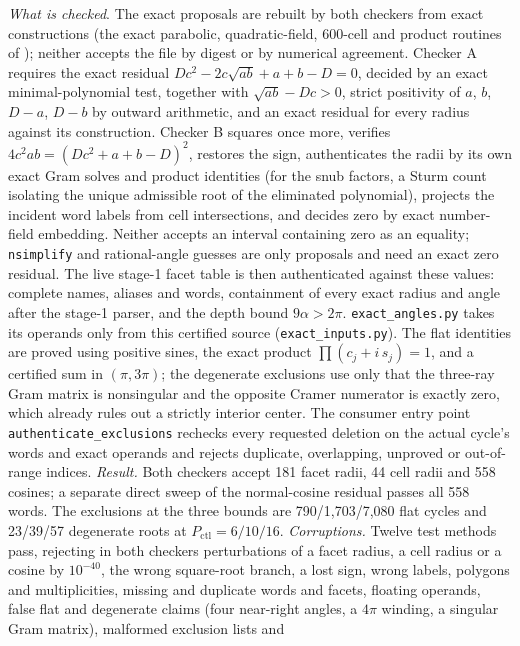 \documentclass[11pt]{article}
\theoremstyle{definition}
\theoremstyle{remark}
\newcommand{\file}[1]{\path{#1}}
\begin{document}
\noindent\emph{What is checked}. The exact proposals
 are rebuilt by both checkers from
exact constructions (the exact parabolic, quadratic-field, 600-cell and
product routines of \file{checks/independent-s1-b2/}); neither accepts the file by
digest or by numerical agreement. Checker A requires the exact residual
$Dc^2-2c\sqrt{ab}+a+b-D=0$, decided by an exact minimal-polynomial test,
together with $\sqrt{ab}-Dc>0$, strict positivity of $a$, $b$, $D-a$,
$D-b$ by outward arithmetic, and an exact residual for every radius
against its construction. Checker B squares once more, verifies
$4c^2ab=(Dc^2+a+b-D)^2$, restores the sign, authenticates the radii by its
own exact Gram solves and product identities (for the snub factors, a
Sturm count isolating the unique admissible root of the eliminated
polynomial), projects the incident word labels from cell intersections,
and decides zero by exact number-field embedding. Neither accepts an
interval containing zero as an equality; \texttt{nsimplify} and
rational-angle guesses are only proposals and need an exact zero
residual. The live stage-1 facet table is then authenticated against
these values: complete names, aliases and words, containment of every
exact radius and angle after the stage-1 parser, and the depth bound
$9\alpha>2\pi$. \texttt{exact\_angles.py} takes its operands only
from this certified source (\texttt{exact\_inputs.py}). The flat
identities are proved using positive sines,
the exact product $\prod(c_j+i\,s_j)=1$, and a certified sum in $(\pi,3\pi)$; the
degenerate exclusions use only that the three-ray Gram matrix is
nonsingular and the opposite Cramer numerator is exactly zero, which
already rules out a strictly interior center. The consumer
entry point \texttt{authenticate\_exclusions} rechecks every requested
deletion on the actual cycle's words and exact operands and rejects
duplicate, overlapping, unproved or out-of-range indices.
\emph{Result.} Both checkers accept 181 facet radii, 44 cell radii and 558
cosines; a separate direct sweep of the normal-cosine residual passes all
558 words. The exclusions at the three bounds are 790/1,703/7,080 flat cycles and 23/39/57 degenerate roots
at $P_{\mathrm{ctl}}=6/10/16$. \emph{Corruptions.} Twelve test methods pass, rejecting
in both checkers perturbations of a facet radius, a cell radius or a cosine
by $10^{-40}$, the wrong square-root branch, a lost sign, wrong labels,
polygons and multiplicities, missing and duplicate words and facets,
floating operands, false flat and degenerate claims (four near-right angles,
a $4\pi$ winding, a singular Gram matrix), malformed exclusion lists and
\end{document}

